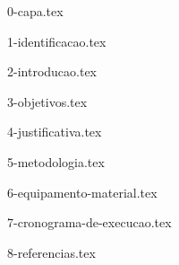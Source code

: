 \documentclass{anteprojeto_tcc}
\begin{document}


{0-capa.tex}

{1-identificacao.tex}

{2-introducao.tex}

{3-objetivos.tex}

{4-justificativa.tex}

{5-metodologia.tex}

{6-equipamento-material.tex}

{7-cronograma-de-execucao.tex}

{8-referencias.tex}
\end{document}
